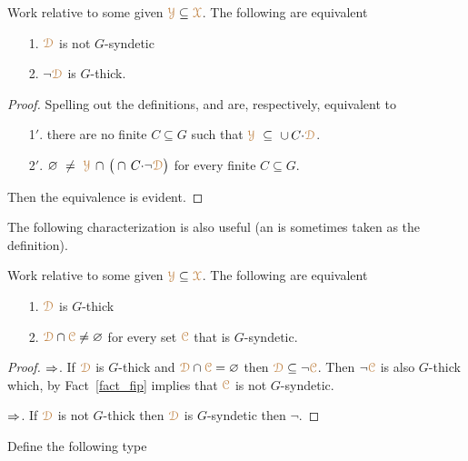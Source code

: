 \begin{fact}\label{fact_fip}
  Work relative to some given ${\color{brown}\EuScript Y}\subseteq{\color{brown}\EuScript X}$.
  The following are equivalent
  \begin{itemize}
    \item[1.] ${\color{brown}\EuScript D}$ is not $G$-syndetic
    \item[2.] $\neg{\color{brown}\EuScript D}$ is $G$-thick.
  \end{itemize}\smallskip
\end{fact}

\begin{proof}
  Spelling out the definitions,  and  are, respectively, equivalent to
  \begin{itemize}
    \item[1$'$.] there are no finite $C\subseteq G$ such that ${\color{brown}\EuScript Y}\ \subseteq\ \cup\, C{\cdot}{\color{brown}\EuScript D}$.
    \item[2$'$.] $\varnothing\ \neq\ {\color{brown}\EuScript Y}\,\cap\,\big(\cap\, C{\cdot}\neg{\color{brown}\EuScript D}\big)$ for every finite $C\subseteq G$.
  \end{itemize} 
  Then the equivalence is evident.
\end{proof}

The following characterization is also useful (an is sometimes taken as the definition).

\begin{corollary}\label{fact_fip2}
  Work relative to some given ${\color{brown}\EuScript Y}\subseteq{\color{brown}\EuScript X}$.
  The following are equivalent
  \begin{itemize}
    \item[1.] ${\color{brown}\EuScript D}$ is $G$-thick
    \item[2.] ${\color{brown}\EuScript D}\cap{\color{brown}\EuScript C}\neq\varnothing$ for every set ${\color{brown}\EuScript C}$ that is $G$-syndetic.
  \end{itemize}
\end{corollary}

\begin{proof}
  $\Rightarrow$. 
  If ${\color{brown}\EuScript D}$ is $G$-thick and ${\color{brown}\EuScript D}\cap{\color{brown}\EuScript C}=\varnothing$ then ${\color{brown}\EuScript D}\subseteq\neg{\color{brown}\EuScript C}$.
  Then $\neg{\color{brown}\EuScript C}$ is also $G$-thick which, by Fact~\ref{fact_fip} implies that ${\color{brown}\EuScript C}$ is not $G$-syndetic.

  $\Rightarrow$. 
  If ${\color{brown}\EuScript D}$ is not $G$-thick then ${\color{brown}\EuScript D}$ is $G$-syndetic then $\neg$.
\end{proof}

Define the following type


